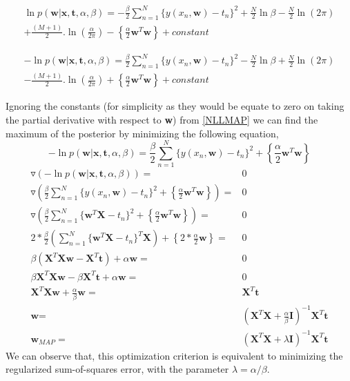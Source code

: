 \documentclass[12pt,twoside,a4paper]{article}
\begin{document}
\begin{multline}
        \ln p(\textbf{w}|\textbf{x},\textbf{t},\alpha,\beta) = -\frac{\beta}{2}\sum_{n=1}^{N} {\{y(x_n,\textbf{w})-t_n\}^2} + \frac{N}{2}\ln\beta - \frac{N}{2}\ln(2\pi) \\ + \frac{(M+1)}{2}.\ln\left( \frac{\alpha}{2\pi}\right) - \left\{ \frac{\alpha}{2}\textbf{w}^T\textbf{w}\right\} + constant
\end{multline}

\begin{multline} \label{NLLMAP}
       - \ln p(\textbf{w}|\textbf{x},\textbf{t},\alpha,\beta) = \frac{\beta}{2}\sum_{n=1}^{N} {\{y(x_n,\textbf{w})-t_n\}^2} - \frac{N}{2}\ln\beta + \frac{N}{2}\ln(2\pi) \\ - \frac{(M+1)}{2}.\ln\left( \frac{\alpha}{2\pi}\right) + \left\{ \frac{\alpha}{2}\textbf{w}^T\textbf{w}\right\} + constant
\end{multline}

Ignoring the constants (for simplicity as they would be equate to zero on taking the partial derivative with respect to \textbf{w}) from \eqref{NLLMAP} we can find the maximum of the posterior by minimizing the following equation,
\begin{equation}
     - \ln p(\textbf{w}|\textbf{x},\textbf{t},\alpha,\beta) = \frac{\beta}{2}\sum_{n=1}^{N} {\{y(x_n,\textbf{w})-t_n\}^2} + \left\{ \frac{\alpha}{2}\textbf{w}^T\textbf{w}\right\} 
\end{equation}
\begin{align}
    \triangledown \left(- \ln p(\textbf{w}|\textbf{x},\textbf{t},\alpha,\beta) \right ) =& 0 \\
    \triangledown \left( \frac{\beta}{2}\sum_{n=1}^{N} {\{y(x_n,\textbf{w})-t_n\}^2} + \left\{ \frac{\alpha}{2}\textbf{w}^T\textbf{w}\right\}  \right ) =& 0 \\
    \triangledown \left( \frac{\beta}{2}\sum_{n=1}^{N} {\{ \textbf{w}^T\textbf{X}-t_n\}^2} + \left\{ \frac{\alpha}{2}\textbf{w}^T\textbf{w}\right\}  \right ) =& 0 \\
    2*\frac{\beta}{2}\left ( \sum_{n=1}^{N} {\{ \textbf{w}^T\textbf{X}-t_n\}^T\textbf{X}} \right) + \left\{ 2*\frac{\alpha}{2}\textbf{w}\right\} =& 0 \\
    \beta( \textbf{X}^T\textbf{X}\textbf{w}-\textbf{X}^T\textbf{t})+ \alpha\textbf{w} =& 0 \\
    \beta\textbf{X}^T\textbf{X}\textbf{w}-\beta\textbf{X}^T\textbf{t}+ \alpha\textbf{w} =& 0 \\
    \textbf{X}^T\textbf{X}\textbf{w}+ \frac{\alpha}{\beta}\textbf{w} =& \textbf{X}^T\textbf{t} \\
 \textbf{w} =& \left(\textbf{X}^T\textbf{X} + \frac{\alpha}{\beta}\textbf{I}\right)^{-1}\textbf{X}^T\textbf{t} \\
 \textbf{w}_{MAP} =& \left(\textbf{X}^T\textbf{X} + \lambda\textbf{I}\right)^{-1}\textbf{X}^T\textbf{t}
\end{align}
We can observe that, this optimization criterion is equivalent to minimizing the regularized sum-of-squares error, with the parameter $\lambda = \alpha/\beta$.
\end{document}
